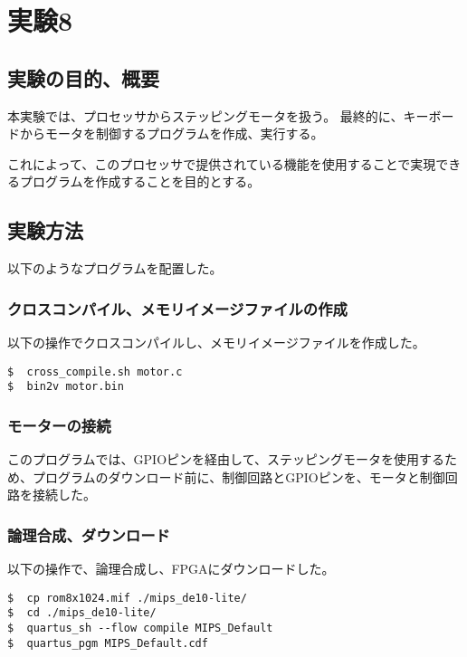 \section{実験8}
\subsection{実験の目的、概要}
本実験では、プロセッサからステッピングモータを扱う。
最終的に、キーボードからモータを制御するプログラムを作成、実行する。

これによって、このプロセッサで提供されている機能を使用することで実現できるプログラムを作成することを目的とする。

\subsection{実験方法}
以下のようなプログラムを配置した。


\subsubsection{クロスコンパイル、メモリイメージファイルの作成}
以下の操作でクロスコンパイルし、メモリイメージファイルを作成した。
\begin{lstlisting}[caption={クロスコンパイル、メモリイメージファイルの作成},label={クロスコンパイル、メモリイメージファイルの作成8}]
$  cross_compile.sh motor.c
$  bin2v motor.bin
\end{lstlisting}

\subsubsection{モーターの接続}
このプログラムでは、GPIOピンを経由して、ステッピングモータを使用するため、プログラムのダウンロード前に、制御回路とGPIOピンを、モータと制御回路を接続した。

\subsubsection{論理合成、ダウンロード}
以下の操作で、論理合成し、FPGAにダウンロードした。
\begin{lstlisting}[caption={論理合成、ダウンロード},label={論理合成、ダウンロード8}]
$  cp rom8x1024.mif ./mips_de10-lite/
$  cd ./mips_de10-lite/
$  quartus_sh --flow compile MIPS_Default
$  quartus_pgm MIPS_Default.cdf
\end{lstlisting}

